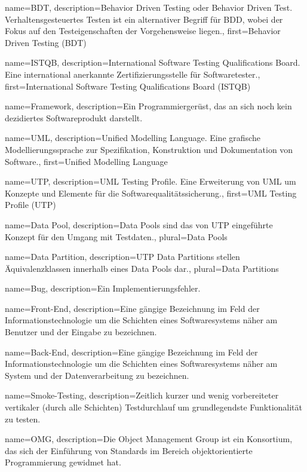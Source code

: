  {
	name={BDT},
	description={Behavior Driven Testing oder Behavior Driven Test. Verhaltensgesteuertes Testen ist ein alternativer Begriff für BDD, wobei der Fokus auf den Testeigenschaften der Vorgehensweise liegen.},
	first={Behavior Driven Testing (BDT)}
}

 {
	name={ISTQB},
	description={International Software Testing Qualifications Board. Eine international anerkannte Zertifizierungsstelle für Softwaretester.},
	first={International Software Testing Qualifications Board (ISTQB)}
}

 {
	name={Framework},
	description={Ein Programmiergerüst, das an sich noch kein dezidiertes Softwareprodukt darstellt.}
}

 {
	name={UML},
	description={Unified Modelling Language. Eine grafische Modellierungssprache zur Spezifikation, Konstruktion und Dokumentation von Software.},
	first={Unified Modelling Language}
}

 {
	name={UTP},
	description={UML Testing Profile. Eine Erweiterung von UML um Konzepte und Elemente für die Softwarequalitätssicherung.},
	first={UML Testing Profile (UTP)}
}

 {
	name={Data Pool},
	description={Data Pools sind das von UTP eingeführte Konzept für den Umgang mit Testdaten.},
	plural={Data Pools}
}

 {
	name={Data Partition},
	description={UTP Data Partitions stellen Äquivalenzklassen innerhalb eines Data Pools dar.},
	plural={Data Partitions}
}

 {
	name={Bug},
	description={Ein Implementierungsfehler.}
}

 {
	name={Front-End},
	description={Eine gängige Bezeichnung im Feld der Informationstechnologie um die Schichten eines Softwaresystems näher am Benutzer und der Eingabe zu bezeichnen.}
}

 {
	name={Back-End},
	description={Eine gängige Bezeichnung im Feld der Informationstechnologie um die Schichten eines Softwaresystems näher am System und der Datenverarbeitung zu bezeichnen.}
}


 {
	name={Smoke-Testing},
	description={Zeitlich kurzer und wenig vorbereiteter vertikaler (durch alle Schichten) Testdurchlauf um grundlegendste Funktionalität zu testen.}
}

 {
	name={OMG},
	description={Die Object Management Group ist ein Konsortium, das sich der Einführung von Standards im Bereich objektorientierte Programmierung gewidmet hat.}
}